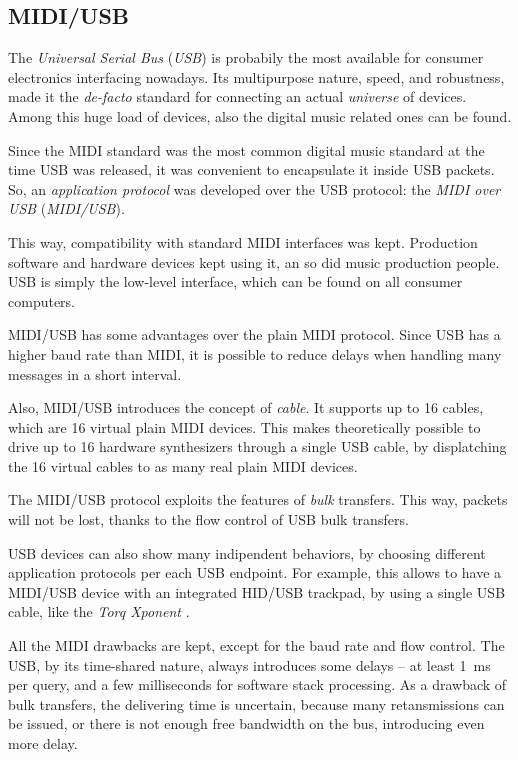 \documentclass[a4paper,10pt]{article}
\begin{document}
\begin{multicols}{2}
\subsection{MIDI/USB}

The \emph{Universal Serial Bus} (\emph{USB}) \cite{usb_docs} is probabily the
most available for consumer electronics interfacing nowadays. Its multipurpose
nature, speed, and robustness, made it the \emph{de-facto} standard for
connecting an actual \emph{universe} of devices. Among this huge load of
devices, also the digital music related ones can be found.

Since the MIDI standard was the most common digital music standard at the time
USB was released, it was convenient to encapsulate it inside USB packets.
So, an \emph{application protocol} was developed over the USB protocol: the
\emph{MIDI over USB} (\emph{MIDI/USB}).

This way, compatibility with standard MIDI interfaces was kept. Production
software and hardware devices kept using it, an so did music production
people. USB is simply the low-level interface, which can be found on all
consumer computers.

MIDI/USB has some advantages over the plain MIDI protocol. Since USB has a
higher baud rate than MIDI, it is possible to reduce delays when handling
many messages in a short interval.

Also, MIDI/USB introduces the concept of \emph{cable}. It supports up to 16
cables, which are 16 virtual plain MIDI devices. This makes theoretically
possible to drive up to 16 hardware synthesizers through a single USB cable,
by displatching the 16 virtual cables to as many real plain MIDI devices.

The MIDI/USB protocol exploits the features of \emph{bulk} transfers. This
way, packets will not be lost, thanks to the flow control of USB bulk
transfers.

USB devices can also show many indipendent behaviors, by choosing different
application protocols per each USB endpoint. For example, this allows to have
a MIDI/USB device with an integrated HID/USB trackpad,
by using a single USB cable, like the \emph{Torq Xponent} \cite{maudio_xponent}.

All the MIDI drawbacks are kept, except for the baud rate and flow control.
The USB, by its time-shared nature, always introduces some delays -- at
least 1~ms per query, and a few milliseconds for software stack processing.
As a drawback of bulk transfers, the delivering time is uncertain, because
many retansmissions can be issued, or there is not enough free bandwidth on
the bus, introducing even more delay.



\end{multicols}
\end{document}
